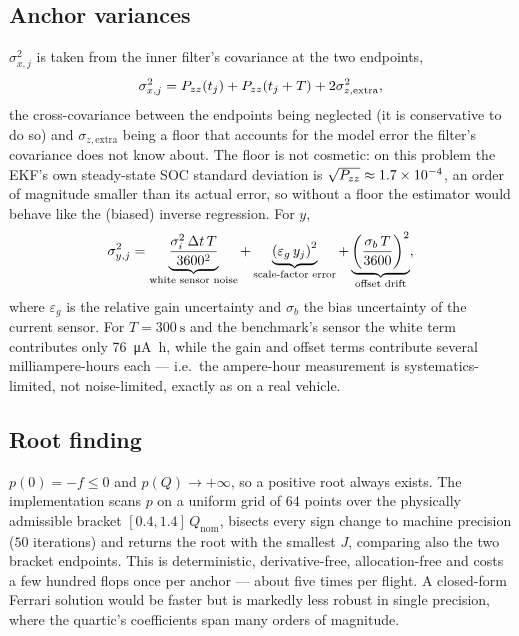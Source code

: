 \subsection{Anchor variances}
$\sigma_{x,j}^2$ is taken from the inner filter's covariance at the two endpoints,
\begin{equation}
\sigma_{x,j}^2=P_{zz}(t_j)+P_{zz}(t_j+T)+2\sigma_{z,\text{extra}}^2 ,
\label{eq:aw-sx}
\end{equation}
the cross-covariance between the endpoints being neglected (it is conservative to do so) and
$\sigma_{z,\text{extra}}$ being a floor that accounts for the model error the filter's covariance
does not know about.  The floor is not cosmetic: on this problem the EKF's own steady-state SOC
standard deviation is $\sqrt{P_{zz}}\approx1.7\times10^{-4}$, an order of magnitude smaller
than its actual error, so without a floor the estimator would behave like the (biased) inverse
regression.  For $y$,
\begin{equation}
\sigma_{y,j}^2=\underbrace{\frac{\sigma_i^2\,\Delta t\,T}{3600^2}}_{\text{white sensor noise}}
+\underbrace{\left(\varepsilon_g\,y_j\right)^2}_{\text{scale-factor error}}
+\underbrace{\left(\frac{\sigma_b\,T}{3600}\right)^2}_{\text{offset drift}} ,
\label{eq:aw-sy}
\end{equation}
where $\varepsilon_g$ is the relative gain uncertainty and $\sigma_b$ the bias uncertainty of the
current sensor.  For $T=\SI{300}{\second}$ and the benchmark's sensor the white term contributes
only \SI{76}{\micro\ampere\hour}, while the gain and offset terms contribute several
milliampere-hours each --- i.e.\ the ampere-hour measurement is systematics-limited, not
noise-limited, exactly as on a real vehicle.

\subsection{Root finding}
$p(0)=-f\le0$ and $p(Q)\to+\infty$, so a positive root always exists.  The implementation scans
$p$ on a uniform grid of $64$ points over the physically admissible bracket
$[0.4,1.4]\,Q_\text{nom}$, bisects every sign change to machine precision ($50$ iterations) and
returns the root with the smallest $J$, comparing also the two bracket endpoints.  This is
deterministic, derivative-free, allocation-free and costs a few hundred flops once per anchor ---
about five times per flight.  A closed-form Ferrari solution would be faster but is markedly less
robust in single precision, where the quartic's coefficients span many orders of magnitude.

